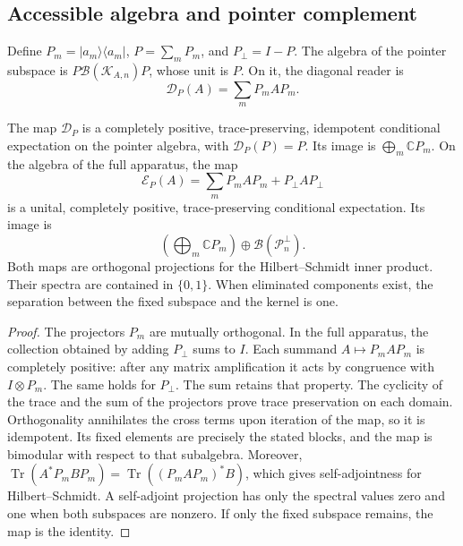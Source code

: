 

\subsection{Accessible algebra and pointer complement}
\label{vii:sec:observador-expectativa}

Define \(P_m=|a_m\rangle\langle a_m|\),
\(P=\sum_mP_m\), and \(P_\perp=I-P\). The algebra of the pointer
subspace is \(P\mathcal B(\mathcal K_{A,n})P\), whose unit is \(P\).
On it, the diagonal reader is
\[
 \mathcal D_P(A)=\sum_mP_mAP_m.
\]

\begin{proposition}
\label{vii:prop:observador-pinzamiento}
The map \(\mathcal D_P\) is a completely positive,
trace-preserving, idempotent conditional expectation on the
pointer algebra, with \(\mathcal D_P(P)=P\). Its image is
\(\bigoplus_m\mathbb CP_m\).
On the algebra of the full apparatus, the map
\begin{equation}
 \mathcal E_P(A)=\sum_mP_mAP_m+P_\perp AP_\perp
 \label{vii:eq:observador-complemento}
\end{equation}
is a unital, completely positive, trace-preserving
conditional expectation. Its image is
\[
 \left(\bigoplus_m\mathbb CP_m\right)
 \oplus\mathcal B(\mathcal P_n^\perp).
\]
Both maps are orthogonal projections for the
Hilbert--Schmidt inner product. Their spectra are contained in \(\{0,1\}\).
When eliminated components exist, the separation between the
fixed subspace and the kernel is one.
\end{proposition}

\begin{proof}
The projectors \(P_m\) are mutually orthogonal. In the full
apparatus, the collection obtained by adding \(P_\perp\) sums to \(I\). Each summand
\(A\mapsto P_mAP_m\) is completely positive: after any
matrix amplification it acts by congruence with \(I\otimes P_m\).
The same holds for \(P_\perp\). The sum retains that property.
The cyclicity of the trace and the sum of the projectors prove
trace preservation on each domain. Orthogonality annihilates the
cross terms upon iteration of the map, so it is idempotent.
Its fixed elements are precisely the stated blocks, and the
map is bimodular with respect to that subalgebra.
Moreover,
\(\operatorname{Tr}(A^*P_mBP_m)
 =\operatorname{Tr}((P_mAP_m)^*B)\),
which gives self-adjointness for Hilbert--Schmidt. A self-adjoint
projection has only the spectral values zero and one when
both subspaces are nonzero. If only the fixed subspace remains,
the map is the identity.
\end{proof}

